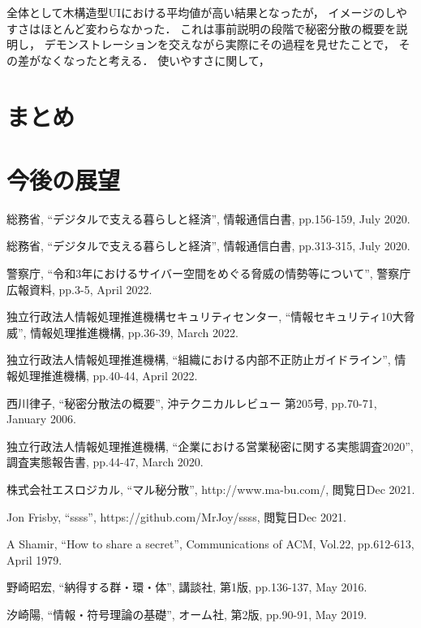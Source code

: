 \documentclass[twocolumn, fleqn, uplatex]{jsarticle}
\begin{document}
全体として木構造型UIにおける平均値が高い結果となったが，%
イメージのしやすさはほとんど変わらなかった．%
これは事前説明の段階で秘密分散の概要を説明し，%
デモンストレーションを交えながら実際にその過程を見せたことで，%
その差がなくなったと考える．
使いやすさに関して，

\section{まとめ}
\section{今後の展望}

\begin{thebibliography}{9}
	\footnotesize
		総務省, 
		``デジタルで支える暮らしと経済'', 
		情報通信白書, pp.156-159, July 2020.

		総務省, 
		``デジタルで支える暮らしと経済'', 
		情報通信白書, pp.313-315, July 2020.
	
		警察庁, 
		``令和3年におけるサイバー空間をめぐる脅威の情勢等について'', 
		警察庁 広報資料, pp.3-5, April 2022.
	
		独立行政法人情報処理推進機構セキュリティセンター, 
		``情報セキュリティ10大脅威'', 
		情報処理推進機構, pp.36-39, March 2022.

		独立行政法人情報処理推進機構, 
		``組織における内部不正防止ガイドライン'', 
		情報処理推進機構, pp.40-44, April 2022.
	
		西川律子,
		``秘密分散法の概要'', 
		沖テクニカルレビュー 第205号, pp.70-71, January 2006.

		独立行政法人情報処理推進機構, 
		``企業における営業秘密に関する実態調査2020'', 
		調査実態報告書, pp.44-47, March 2020.
	
		株式会社エスロジカル, 
		``マル秘分散'', 
		http://www.ma-bu.com/, 
		閲覧日Dec 2021.
	
		Jon Frisby, 
		``ssss'', 
		https://github.com/MrJoy/ssss, 
		閲覧日Dec 2021.
	
		A Shamir, 
		``How to share a secret'', 
		Communications of ACM, Vol.22, pp.612-613, April 1979.
	
		野崎昭宏, 
		``納得する群・環・体'', 
		講談社, 第1版, pp.136-137, May 2016.
	
		汐崎陽, 
		``情報・符号理論の基礎'', 
		オーム社, 第2版, pp.90-91, May 2019.
	

\end{thebibliography}
\end{document}
